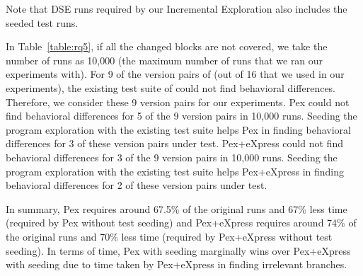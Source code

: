 Note that DSE runs required by our Incremental Exploration also includes the seeded test runs.
 
In Table~\ref{table:rq5}, if all the changed blocks are not covered, we take the 
number of runs as 10,000 (the maximum number of runs that we ran our experiments with).
For 9 of the version pairs of  (out of 16 that we used in our experiments), the existing test suite of  could not find behavioral differences. Therefore, we consider these 9 version pairs for our experiments. 
Pex could not find behavioral differences for 5 of the 9 version pairs in 10,000 runs. Seeding the program exploration with the existing test suite helps Pex in finding behavioral differences for 3 of these version pairs under test.
Pex+eXpress could not find behavioral differences for 3 of the 9 version pairs in 10,000 runs. Seeding the program exploration with the existing test suite helps Pex+eXpress in finding behavioral differences for 2 of these version pairs under test.

In summary, Pex requires around 67.5\% of the original runs and 67\% less time (required by Pex without test seeding) 
and Pex+eXpress requires around 74\% of the original runs and 70\% less time (required by Pex+eXpress without test seeding).
In terms of time, Pex with seeding marginally wins over Pex+eXpress 
with seeding due to time taken by Pex+eXpress in finding irrelevant branches.


